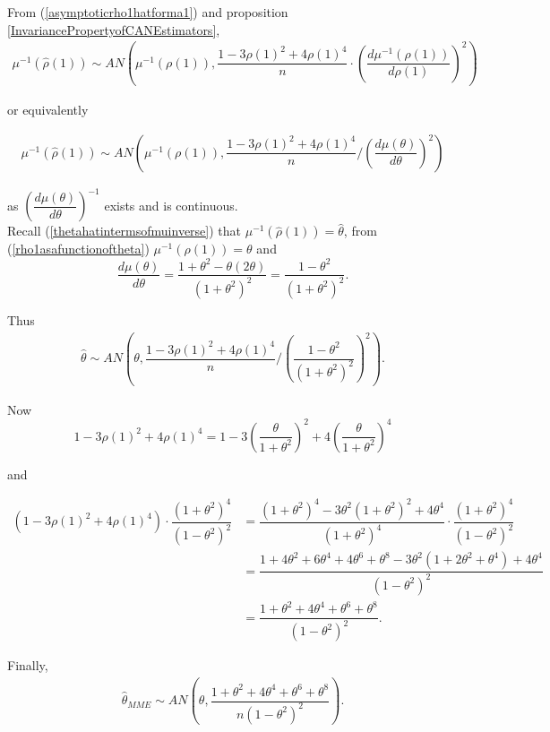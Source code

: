 \documentclass[11pt, a4paper]{article}
\numberwithin{equation}{section}
\theoremstyle{definition}
\begin{document}
From (\ref{asymptoticrho1hatforma1}) and proposition \ref{InvariancePropertyofCANEstimators},
\begin{align*}
\mu^{-1}(\hat{\rho}(1)) \sim AN\left( \mu^{-1}(\rho(1)), \dfrac{1 - 3\rho(1)^2 + 4\rho(1)^4}{n} \cdot \left( \dfrac{d\mu^{-1}(\rho(1))}{d\rho(1)} \right)^2 \right)
\end{align*}

or equivalently

\begin{align*}
\mu^{-1}(\hat{\rho}(1)) \sim AN\left( \mu^{-1}(\rho(1)), \dfrac{1 - 3\rho(1)^2 + 4\rho(1)^4}{n} \Bigg/ \left( \dfrac{d\mu (\theta)}{d\theta} \right)^2 \right)
\end{align*}

as $\left( \dfrac{d\mu (\theta)}{d\theta} \right)^{-1}$ exists and is continuous. \\[0.2em]

Recall (\ref{thetahatintermsofmuinverse}) that $\mu^{-1}(\hat{\rho}(1)) = \hat{\theta}$, from (\ref{rho1asafunctionoftheta}) $\mu^{-1}({\rho}(1)) = \theta$ and $$\dfrac{d\mu (\theta)}{d\theta} = \dfrac{1 + \theta^2 - \theta (2 \theta)}{(1 + \theta^2)^2} = \dfrac{1 - \theta^2}{(1 + \theta^2)^2}.$$

Thus
\begin{align*}
\hat{\theta} \sim AN\left( \theta, \dfrac{1 - 3\rho(1)^2 + 4\rho(1)^4}{n} \Bigg/ \left( \dfrac{1 - \theta^2}{(1 + \theta^2)^2} \right)^2 \right).
\end{align*}

Now
$$1 - 3\rho(1)^2 + 4\rho(1)^4 = 1 - 3 \left( \dfrac{\theta}{1 + \theta^2} \right)^2 + 4\left( \dfrac{\theta}{1 + \theta^2} \right)^4$$

and

\begin{align*}
\left( 1 - 3\rho(1)^2 + 4\rho(1)^4 \right) \cdot \dfrac{(1 + \theta^2)^4}{(1 - \theta^2)^2} &= \dfrac{(1 + \theta^2)^4 - 3 \theta^2 (1 + \theta^2)^2 + 4 \theta^4}{(1 + \theta^2)^4} \cdot \dfrac{(1 + \theta^2)^4}{(1 - \theta^2)^2} \\[0.5em]
&= \dfrac{1 + 4 \theta^2 + 6 \theta^4 + 4 \theta^6 + \theta^8 - 3 \theta^2 (1 + 2\theta^2 + \theta^4) + 4\theta^4}{(1 - \theta^2)^2} \\[0.5em]
&= \dfrac{1 + \theta^2 + 4 \theta^4 + \theta^6 + \theta^8}{(1 - \theta^2)^2}.
\end{align*}

Finally,
\begin{align*}
\hat{\theta}_{MME} \sim AN\left( \theta, \dfrac{1 + \theta^2 + 4 \theta^4 + \theta^6 + \theta^8}{n(1 - \theta^2)^2} \right).
\end{align*}
\end{document}

